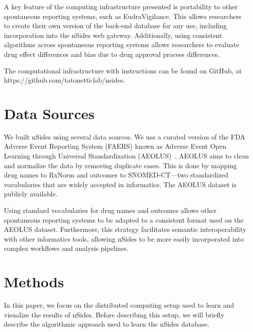 \documentclass{ws-procs11x85}
\begin{document}
A key feature of the computing infrastructure presented is portability
to other spontaneous reporting systems, such as EudraVigilance.  This
allows researchers to create their own version of the back-end
database for any use, including incorporation into the nSides web
gateway. Additionally, using consistent algorithms across
spontaneous reporting systems allows researchers to evaluate drug
effect differences and bias due to drug approval process differences.

The computational infrastructure with instructions can be found on
GitHub, at https://github.com/tatonetti-lab/nsides.


\section{Data Sources}

We built nSides using several data sources. We use a
curated version of the FDA Adverse Event Reporting System (FAERS)
known as Adverse Event Open Learning through Universal Standardization
(AEOLUS)~\cite{AEOLUS}.  AEOLUS aims to clean and normalize the data
by removing duplicate cases. This is done by mapping drug names to RxNorm and outcomes to SNOMED-CT---two standardized vocabularies that are widely accepted in informatics. The AEOLUS dataset is publicly available.

Using standard vocabularies for drug names and outcomes allows
other spontaneous reporting systems to be adapted to a consistent
format used on the AEOLUS dataset. Furthermore, this strategy facilitates
semantic interoperability with other informatics tools, allowing nSides to be
more easily incorporated into complex workflows and analysis pipelines.

\section{Methods}
In this paper, we focus on the distributed computing setup used to learn and visualize the results of nSides. Before describing this setup, we will briefly describe the algorithmic approach used to learn the nSides database.
\end{document}
